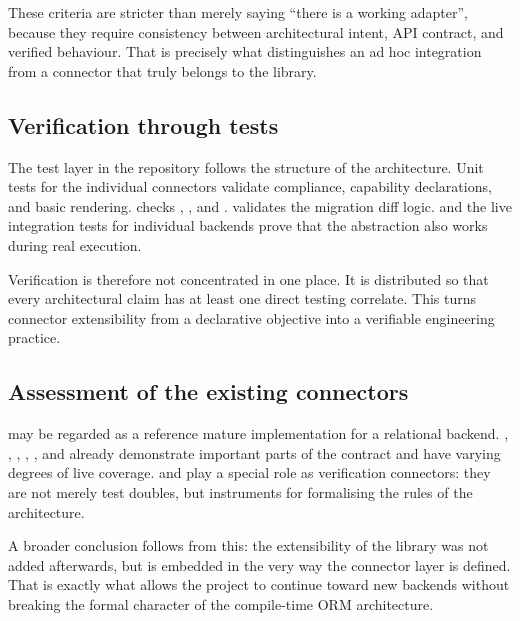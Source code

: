 These criteria are stricter than merely saying ``there is a working adapter'', because they require consistency between architectural intent, API contract, and verified behaviour. That is precisely what distinguishes an ad hoc integration from a connector that truly belongs to the library.

\subsection{Verification through tests}

The test layer in the repository follows the structure of the architecture. Unit tests for the individual connectors validate  compliance, capability declarations, and basic rendering.  checks , , and .  validates the migration diff logic.  and the live integration tests for individual backends prove that the abstraction also works during real execution.

Verification is therefore not concentrated in one place. It is distributed so that every architectural claim has at least one direct testing correlate. This turns connector extensibility from a declarative objective into a verifiable engineering practice.

\subsection{Assessment of the existing connectors}

 may be regarded as a reference mature implementation for a relational backend. , , , , , and  already demonstrate important parts of the contract and have varying degrees of live coverage.  and  play a special role as verification connectors: they are not merely test doubles, but instruments for formalising the rules of the architecture.

A broader conclusion follows from this: the extensibility of the library was not added afterwards, but is embedded in the very way the connector layer is defined. That is exactly what allows the project to continue toward new backends without breaking the formal character of the compile-time ORM architecture.

